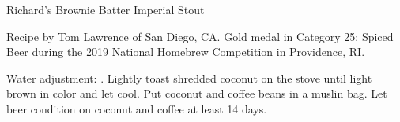 \begin{recipe}{Richard's Brownie Batter Imperial Stout}

\begin{aboutblock}
Recipe by Tom Lawrence of San Diego, CA. Gold medal in Category 25: Spiced
Beer during the 2019 National Homebrew Competition in Providence, RI. \sourceaha
\end{aboutblock}


\begin{methodandtiming}
 
\begin{mashsteps}
\end{mashsteps}

\begin{fermentationsteps}
\end{fermentationsteps}

\begin{directions}
Water adjustment: . Lightly toast shredded
coconut on the stove until light brown in color and let cool. Put coconut and
coffee beans in a muslin bag. Let beer condition on coconut and coffee at least
14 days.
\end{directions}

\end{methodandtiming}

\recipebreak

\begin{ingredientsblock}

\begin{malts}
\end{malts}

\begin{hops}
\end{hops}


\begin{twists}
\end{twists}

\end{ingredientsblock}

\end{recipe}
